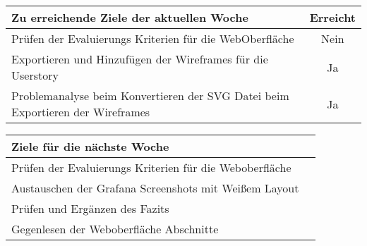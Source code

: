 \begin{tabularx}{\textwidth}{Xc}
    \arrayrulecolor{OliveGreen}
    \toprule
    {\bfseries Zu erreichende Ziele der aktuellen Woche} & {\bfseries Erreicht} \\
    \midrule[2pt]
    Prüfen der Evaluierungs Kriterien für die WebOberfläche &Nein            \\
    \rowcolor{OliveGreen!15}
    Exportieren und Hinzufügen der Wireframes für die Userstory      &Ja     \\
    \rowcolor{White}
    Problemanalyse beim Konvertieren der SVG Datei beim Exportieren der
    Wireframes                                              &Ja              \\
    \bottomrule[2pt]
\end{tabularx}
%
\vspace{1cm}
%
\begin{tabularx}{\textwidth}{Xc}
    \arrayrulecolor{OliveGreen}
    \toprule
    {\bfseries Ziele für die nächste Woche}        &                         \\
    \midrule[2pt]
    Prüfen der Evaluierungs Kriterien für die Weboberfläche    &             \\
    \rowcolor{OliveGreen!15}
    Austauschen der Grafana Screenshots mit Weißem Layout &                  \\
    \rowcolor{White}
    Prüfen und Ergänzen des Fazits                         &                 \\
    \rowcolor{OliveGreen!15}
    Gegenlesen der Weboberfläche Abschnitte               &                  \\
\end{tabularx}
